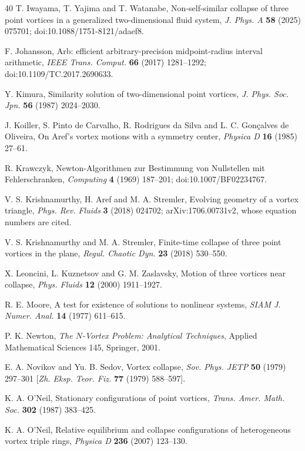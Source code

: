 \documentclass[11pt]{article}
\theoremstyle{definition}
\begin{document}
\begin{thebibliography}{40}
 T. Iwayama, T. Yajima and T. Watanabe, Non-self-similar collapse of three point vortices in a generalized two-dimensional fluid system, \emph{J. Phys. A} \textbf{58} (2025) 075701; doi:10.1088/1751-8121/adaef8.

 F. Johansson, Arb: efficient arbitrary-precision midpoint-radius interval arithmetic, \emph{IEEE Trans. Comput.} \textbf{66} (2017) 1281--1292; doi:10.1109/TC.2017.2690633.

 Y. Kimura, Similarity solution of two-dimensional point vortices, \emph{J. Phys. Soc. Jpn.} \textbf{56} (1987) 2024--2030.

 J. Koiller, S. Pinto de Carvalho, R. Rodrigues da Silva and L. C. Gon\c{c}alves de Oliveira, On Aref's vortex motions with a symmetry center, \emph{Physica D} \textbf{16} (1985) 27--61.

 R. Krawczyk, Newton-Algorithmen zur Bestimmung von Nullstellen mit Fehlerschranken, \emph{Computing} \textbf{4} (1969) 187--201; doi:10.1007/BF02234767.

 V. S. Krishnamurthy, H. Aref and M. A. Stremler, Evolving geometry of a vortex triangle, \emph{Phys. Rev. Fluids} \textbf{3} (2018) 024702; arXiv:1706.00731v2, whose equation numbers are cited.

 V. S. Krishnamurthy and M. A. Stremler, Finite-time collapse of three point vortices in the plane, \emph{Regul. Chaotic Dyn.} \textbf{23} (2018) 530--550.

 X. Leoncini, L. Kuznetsov and G. M. Zaslavsky, Motion of three vortices near collapse, \emph{Phys. Fluids} \textbf{12} (2000) 1911--1927.

 R. E. Moore, A test for existence of solutions to nonlinear systems, \emph{SIAM J. Numer. Anal.} \textbf{14} (1977) 611--615.

 P. K. Newton, \emph{The $N$-Vortex Problem: Analytical Techniques}, Applied Mathematical Sciences 145, Springer, 2001.

 E. A. Novikov and Yu. B. Sedov, Vortex collapse, \emph{Sov. Phys. JETP} \textbf{50} (1979) 297--301 [\emph{Zh. Eksp. Teor. Fiz.} \textbf{77} (1979) 588--597].

 K. A. O'Neil, Stationary configurations of point vortices, \emph{Trans. Amer. Math. Soc.} \textbf{302} (1987) 383--425.

 K. A. O'Neil, Relative equilibrium and collapse configurations of heterogeneous vortex triple rings, \emph{Physica D} \textbf{236} (2007) 123--130.


\end{thebibliography}
\end{document}
